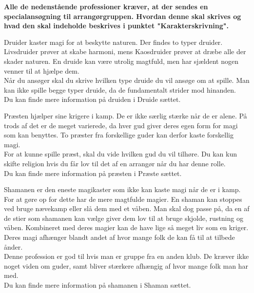 \textbf{Alle de nedenstående professioner kræver, at der sendes en specialansøgning til arrangørgruppen. Hvordan denne skal skrives og hvad den skal indeholde beskrives i punktet "Karakterskrivning".}

\begin{prof*}
Druider kaster magi for at beskytte naturen. Der findes to typer druider. Livsdruider prøver at skabe harmoni, mens Kaosdruider prøver at dræbe alle der skader naturen. En druide kan være utrolig magtfuld, men har sjældent nogen venner til at hjælpe dem.\\
Når du ansøger skal du skrive hvilken type druide du vil ansøge om at spille. Man kan ikke spille begge typer druide, da de fundamentalt strider mod hinanden.\\
Du kan finde mere information på druiden i Druide sættet.
\end{prof*}

\begin{prof*}
Præsten hjælper sine krigere i kamp. De er ikke særlig stærke når de er alene. På trods af det er de meget varierede, da hver gud giver deres egen form for magi som kan benyttes. To præster fra forskellige guder kan derfor kaste forskellig magi.\\
For at kunne spille præst, skal du vide hvilken gud du vil tilhøre. Du kan kun skifte religion hvis du får lov til det af en arrangør når du har denne rolle.\\
Du kan finde mere information på præsten i Præste sættet.
\end{prof*}

\begin{prof*}
Shamanen er den eneste magikaster som ikke kan kaste magi når de er i kamp. For at gøre op for dette har de mere magtfulde magier. En shaman kan stoppes ved bruge nævekamp eller slå dem med et våben. Man skal dog passe på, da en af de stier som shamanen kan vælge giver dem lov til at bruge skjolde, rustning og våben. Kombineret med deres magier kan de have lige så meget liv som en kriger. Deres magi afhænger blandt andet af hvor mange folk de kan få til at tilbede ånder.\\
Denne profession er god til hvis man er gruppe fra en anden klub. De kræver ikke noget viden om guder, samt bliver stærkere afhængig af hvor mange folk man har med.\\
Du kan finde mere information på shamanen i Shaman sættet.
\end{prof*}

